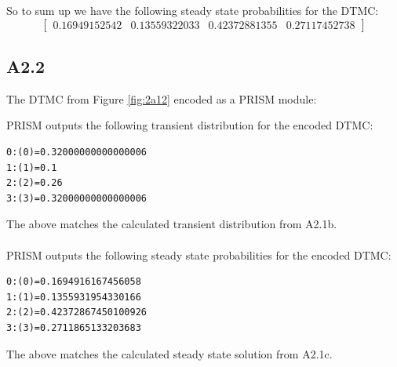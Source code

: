 \documentclass[12pt]{report}
\begin{document}
So to sum up we have the following steady state probabilities for the DTMC:
$$\left[
	\begin{matrix}
		0.16949152542 & 0.13559322033 & 0.42372881355 & 0.27117452738
	\end{matrix}
\right]$$

\subsection*{A2.2}
The DTMC from Figure \ref{fig:2a12} encoded as a PRISM module:


PRISM outputs the following transient distribution for the encoded DTMC:
\begin{lstlisting}[style=logoutput]
0:(0)=0.32000000000000006
1:(1)=0.1
2:(2)=0.26
3:(3)=0.32000000000000006
\end{lstlisting}
The above matches the calculated transient distribution from A2.1b.\\
\\
PRISM outputs the following steady state probabilities for the encoded DTMC:
\begin{lstlisting}[style=logoutput]
0:(0)=0.1694916167456058
1:(1)=0.1355931954330166
2:(2)=0.42372867450100926
3:(3)=0.2711865133203683
\end{lstlisting}
The above matches the calculated steady state solution from A2.1c.
\end{document}
